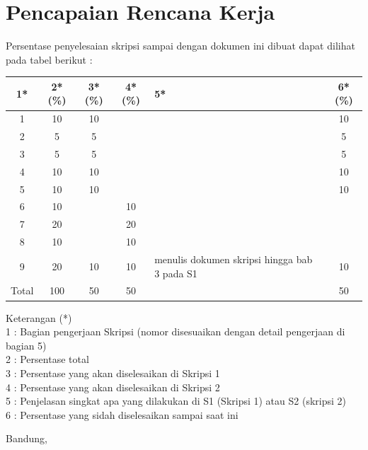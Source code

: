 \documentclass[a4paper,twoside]{article}
\begin{document}



\section{Pencapaian Rencana Kerja}
Persentase penyelesaian skripsi sampai dengan dokumen ini dibuat dapat dilihat pada tabel berikut :

\begin{center}
  \begin{tabular}{ | c | c | c | c | l | c |}
    \hline
    1*  & 2*(\%) & 3*(\%) & 4*(\%) &5* &6*(\%)\\ \hline \hline
    1   & 10 & 10 & & & 10\\ \hline
    2   & 5 & 5 & & & 5 \\ \hline
    3   & 5 & 5 & & & 5 \\ \hline
    4   & 10 & 10 & & & 10 \\ \hline
    5   & 10 & 10 & & & 10 \\ \hline
    6   & 10 & & 10 & &\\ \hline
    7   & 20 & & 20 & &\\ \hline
    8   & 10 & & 10 & &\\ \hline
    9   & 20 & 10 & 10 &{\footnotesize menulis dokumen skripsi hingga bab 3 pada S1} &10\\ \hline
    Total  & 100  & 50  & 50 &  & 50\\ \hline
                          \end{tabular}
\end{center}

Keterangan (*)\\
1 : Bagian pengerjaan Skripsi (nomor disesuaikan dengan detail pengerjaan di bagian 5)\\
2 : Persentase total \\
3 : Persentase yang akan diselesaikan di Skripsi 1 \\
4 : Persentase yang akan diselesaikan di Skripsi 2 \\
5 : Penjelasan singkat apa yang dilakukan di S1 (Skripsi 1) atau S2 (skripsi 2)\\
6 : Persentase yang sidah diselesaikan sampai saat ini 

\vspace{1cm}
\centering Bandung, \tanggal\\
\vspace{2cm} \nama \\ 
\vspace{1cm}
\end{document}
